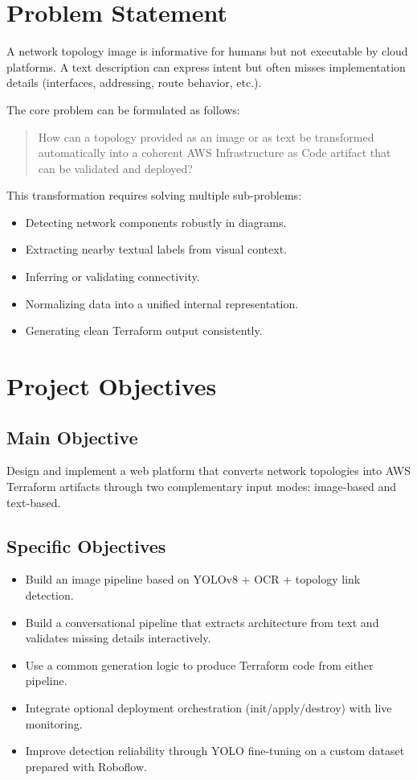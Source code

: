 \documentclass[12pt,a4paper,openany]{report}
\begin{document}
\section{Problem Statement}

A network topology image is informative for humans but not executable by cloud platforms. A text description can express intent but often misses implementation details (interfaces, addressing, route behavior, etc.).

The core problem can be formulated as follows:
\begin{quote}
How can a topology provided as an image or as text be transformed automatically into a coherent AWS Infrastructure as Code artifact that can be validated and deployed?
\end{quote}

This transformation requires solving multiple sub-problems:
\begin{itemize}
    \item Detecting network components robustly in diagrams.
    \item Extracting nearby textual labels from visual context.
    \item Inferring or validating connectivity.
    \item Normalizing data into a unified internal representation.
    \item Generating clean Terraform output consistently.
\end{itemize}

\section{Project Objectives}

\subsection{Main Objective}

Design and implement a web platform that converts network topologies into AWS Terraform artifacts through two complementary input modes: image-based and text-based.

\subsection{Specific Objectives}

\begin{itemize}
    \item Build an image pipeline based on YOLOv8 + OCR + topology link detection.
    \item Build a conversational pipeline that extracts architecture from text and validates missing details interactively.
    \item Use a common generation logic to produce Terraform code from either pipeline.
    \item Integrate optional deployment orchestration (init/apply/destroy) with live monitoring.
    \item Improve detection reliability through YOLO fine-tuning on a custom dataset prepared with Roboflow.
\end{itemize}
\end{document}

